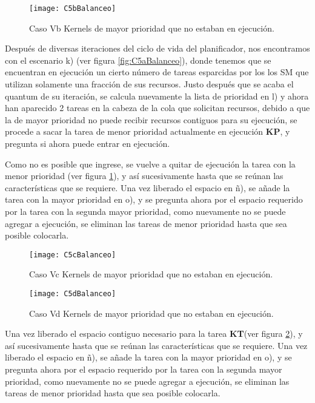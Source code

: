         \begin{figure}[]
      \centering
        \texttt{[image: C5bBalanceo]}
        \caption{Caso Vb Kernels de mayor prioridad que no estaban en ejecución.}
        \label{fig:C5bBalanceo}
    \end{figure}
    
    Después de diversas iteraciones del ciclo de vida del planificador, nos encontramos con el escenario k) (ver figura \ref{fig:C5aBalanceo}), donde tenemos que se encuentran en ejecución un cierto número de tareas esparcidas por los los SM que utilizan solamente una fracción de sus recursos. Justo después que se acaba el quantum de su iteración, se calcula nuevamente la lista de prioridad en l) y ahora han aparecido 2 tareas en la cabeza de la cola que solicitan recursos, debido a que la de mayor prioridad no puede recibir recursos contiguos para su ejecución, se procede a sacar la tarea de menor prioridad actualmente en ejecución \textbf{KP}, y pregunta si ahora puede entrar en ejecución.
\newline

    Como no es posible que ingrese, se vuelve a quitar de ejecución la tarea con la menor prioridad (ver figura  \ref{fig:C5bBalanceo}), y así sucesivamente hasta que se reúnan las características que se requiere. Una vez liberado el espacio en ñ), se añade la tarea con la mayor prioridad en o), y se pregunta ahora por el espacio requerido por la tarea con la segunda mayor prioridad, como nuevamente no se puede agregar a ejecución, se eliminan las tareas de menor prioridad hasta que sea posible colocarla.
\newline

    \begin{figure}[]
      \centering
        \texttt{[image: C5cBalanceo]}
        \caption{Caso Vc Kernels de mayor prioridad que no estaban en ejecución.}
        \label{fig:C5cBalanceo}
    \end{figure}
    
    \begin{figure}[]
      \centering
        \texttt{[image: C5dBalanceo]}
        \caption{Caso Vd Kernels de mayor prioridad que no estaban en ejecución.}
        \label{fig:C5dBalanceo}
    \end{figure}
    
    Una vez liberado el espacio contiguo necesario para la tarea \textbf{KT}(ver figura  \ref{fig:C5cBalanceo}), y así sucesivamente hasta que se reúnan las características que se requiere. Una vez liberado el espacio en ñ), se añade la tarea con la mayor prioridad en o), y se pregunta ahora por el espacio requerido por la tarea con la segunda mayor prioridad, como nuevamente no se puede agregar a ejecución, se eliminan las tareas de menor prioridad hasta que sea posible colocarla.
\newline

